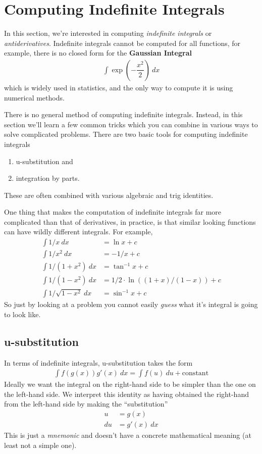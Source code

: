 
\section{Computing Indefinite Integrals}

In this section, we're interested in computing {\it indefinite integrals} or {\it antiderivatives}.
Indefinite integrals cannot be computed for all functions, for example, there is no closed form for the {\bf Gaussian Integral}
\begin{align*}
	\int \exp\left(-\dfrac{x^2}{2} \right) \: dx
\end{align*}
which is widely used in statistics, and the only way to compute it is using numerical methods.


There is no general method of computing indefinite integrals.
Instead, in this section we'll learn a few common tricks which you can combine in various ways to solve complicated problems.
There are two basic tools for computing indefinite integrals
\begin{enumerate}
	\item u-substitution and
	\item integration by parts.
\end{enumerate}
These are often combined with various algebraic and trig identities.

One thing that makes the computation of indefinite integrals far more complicated than that of derivatives, in practice, is that similar looking functions can have wildly different integrals. For example,
\begin{align*}
	\int 1/x \: dx              & = \ln x  + c                          \\
	\int 1/x^2 \: dx            & = -1/x + c                            \\
	\int 1/{(1+x^2)} \: dx      & = \tan^{-1} x + c                     \\
	\int 1/(1 - x^2) \: dx      & = 1/2 \cdot \ln ((1 + x)/(1 - x)) + c \\
	\int 1/\sqrt{1 - x^2} \: dx & = \sin^{-1} x + c
\end{align*}
So just by looking at a problem you cannot easily {\it guess} what it's integral is going to look like.

\subsection{u-substitution}
In terms of indefinite integrals, u-substitution takes the form
\begin{align}
	\label{eq:u-sub}
	\int f\left(g(x)\right) g'(x)\: dx = \int f(u) \: du + \mathrm{constant}
\end{align}
Ideally we want the integral on the right-hand side to be simpler than the one on the left-hand side.
We interpret this identity as having obtained the right-hand from the left-hand side by making the ``substitution''
\begin{align*}
	u  & = g(x)        \\
	du & = g'(x) \: dx
\end{align*}
This is just a {\it mnemonic} and doesn't have a concrete mathematical meaning (at least not a simple one).

